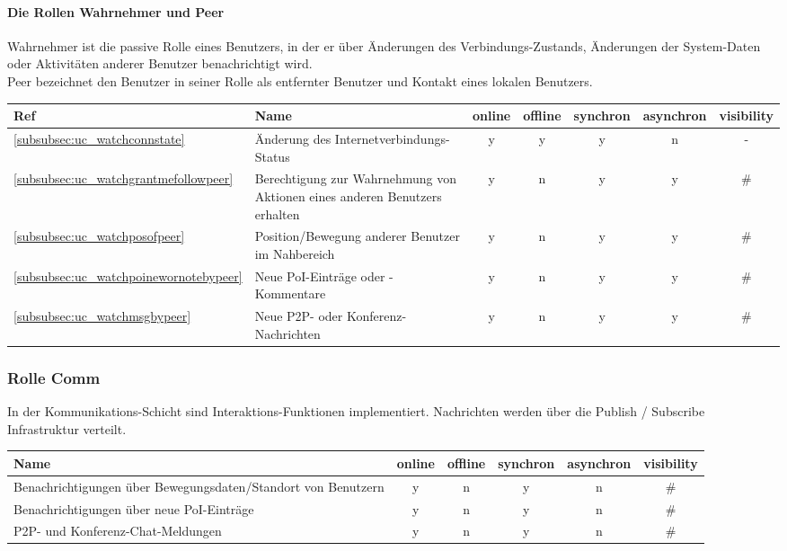 \paragraph{Die Rollen \textbf{Wahrnehmer} und \textbf{Peer}}
Wahrnehmer ist die passive Rolle eines Benutzers, in der er über Änderungen des Verbindungs-Zustands, Änderungen der System-Daten oder Aktivitäten anderer Benutzer benachrichtigt wird.\\
Peer bezeichnet den Benutzer in seiner Rolle als entfernter Benutzer und Kontakt eines lokalen Benutzers.\\
	\begin{table}[H]
		\centering
		\begin{tabulary}{\columnwidth}{|>{\centering}m{1cm}|L|C|C|C|C|C|}
		\hline
			\textbf{Ref} & \textbf{Name} & \textbf{online} & \textbf{offline} & \textbf{synchron} & \textbf{asynchron} & \textbf{visibility} \\ \hline
			\ref{subsubsec:uc_watchconnstate} & Änderung des Internetverbindungs-Status & y & y & y & n & - \\ \hline
			\ref{subsubsec:uc_watchgrantmefollowpeer} & Berechtigung zur Wahrnehmung von Aktionen eines anderen Benutzers erhalten & y & n & y & y & \# \\ \hline
			\ref{subsubsec:uc_watchposofpeer} & Position/Bewegung anderer Benutzer im Nahbereich & y & n & y & y & \# \\ \hline
			\ref{subsubsec:uc_watchpoinewornotebypeer} & Neue PoI-Einträge oder -Kommentare & y & n & y & y & \# \\ \hline
			\ref{subsubsec:uc_watchmsgbypeer} & Neue P2P- oder Konferenz-Nachrichten & y & n & y & y & \# \\ \hline
		\end{tabulary}
	\end{table}

\subsubsection{Rolle \textbf{Comm}}
In der Kommunikations-Schicht sind Interaktions-Funktionen implementiert. Nachrichten werden über die Publish / Subscribe Infrastruktur verteilt.\\
	\begin{table}[H]
		\centering
		\begin{tabulary}{\columnwidth}{|L|C|C|C|C|C|}
		\hline
			\textbf{Name} & \textbf{online} & \textbf{offline} & \textbf{synchron} & \textbf{asynchron} & \textbf{visibility} \\ \hline
			Benachrichtigungen über Bewegungsdaten/Standort von Benutzern & y & n & y & n & \# \\ \hline
			Benachrichtigungen über neue PoI-Einträge & y & n & y & n & \# \\ \hline
			P2P- und Konferenz-Chat-Meldungen & y & n & y & n & \# \\ \hline
		\end{tabulary}
	\end{table}

